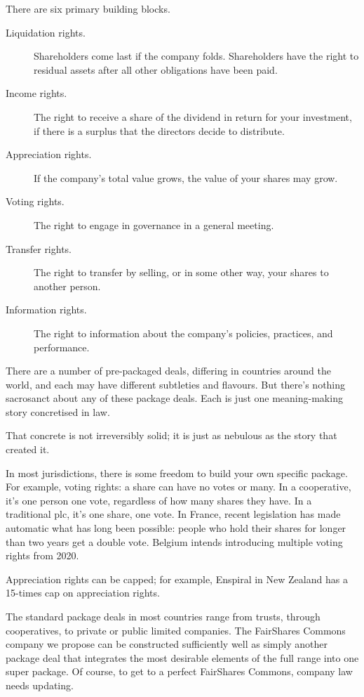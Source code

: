 There are six primary building blocks.


\begin{description}
\item [Liquidation rights.] Shareholders come last if the company folds. Shareholders have the right to residual assets after all other obligations have been paid.
\item [Income rights.] The right to receive a share of the dividend in return for your investment, if there is a surplus that the directors decide to distribute.
\item [Appreciation rights.] If the company’s total value grows, the value of your shares may grow.
\item [Voting rights.] The right to engage in governance in a general meeting.
\item [Transfer rights.] The right to transfer by selling, or in some other way, your shares to another person.
\item [Information rights.] The right to information about the company's policies, practices, and performance.
\end{description}


There are a number of pre-packaged deals, differing in countries around the world, and each may have different subtleties and flavours. But there's nothing sacrosanct about any of these package deals. Each is just one meaning\hyp{}making story concretised in law. 


That concrete is not irreversibly solid; it is just as nebulous as the story that created it.


In most jurisdictions, there is some freedom to build your own specific package. For example, voting rights: a share can have no votes or many. In a cooperative, it's one person one vote, regardless of how many shares they have. In a traditional plc, it's one share, one vote. In France, recent legislation has made automatic what has long been possible: people who hold their shares for longer than two years get a double vote. Belgium intends introducing multiple voting rights from 2020.


Appreciation rights can be capped; for example, Enspiral in New Zealand has a 15-times cap on appreciation rights. 


The standard package deals in most countries range from trusts, through cooperatives, to private or public limited companies. The FairShares Commons  company we propose can be constructed sufficiently well as simply another package deal that integrates the most desirable elements of the full range into one super package. Of course, to get to a perfect FairShares Commons, company law  needs updating.



